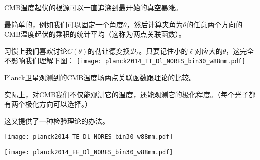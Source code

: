 \documentclass[CJK]{beamer}
\begin{document}





\begin{frame}
\bch
CMB温度起伏的根源可以一直追溯到最开始的真空暴涨。


\skipline
最简单的，例如我们可以固定一个角度$\theta$，然后计算夹角为$\theta$的任意两个方向的CMB温度起伏的乘积的统计平均（这称为两点关联函数）。
\ech
\end{frame}

\begin{frame}
\bch
习惯上我们喜欢讨论$C(\theta)$的勒让德变换$\mathcal{D}_\ell$。只要记住小的$\ell$对应大的$\theta$，这完全不影响我们理解下图：
  \texttt{[image: planck2014\_TT\_Dl\_NORES\_bin30\_w88mm.pdf]}

  Planck卫星观测到的CMB温度场两点关联函数跟理论的比较。
\ech
\end{frame}

\begin{frame}
\bch
实际上，对CMB我们不仅能观测它的温度，还能观测它的极化程度。（每个光子都有两个极化方向可以选择。）


这又提供了一种检验理论的办法。
\ech
\end{frame}


\begin{frame}
  \texttt{[image: planck2014\_TE\_Dl\_NORES\_bin30\_w88mm.pdf]}
\end{frame}

\begin{frame}
  \texttt{[image: planck2014\_EE\_Dl\_NORES\_bin30\_w88mm.pdf]}
\end{frame}
\end{document}
